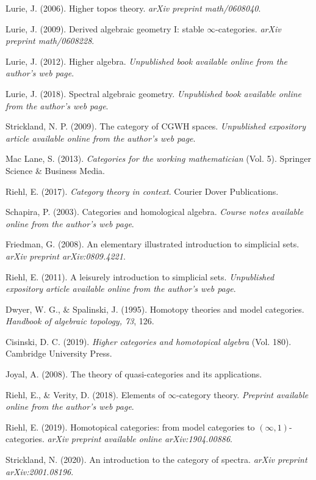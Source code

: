 \documentclass[10pt]{amsart}
\newcommand{\8}{\ensuremath{\infty}}
\newcommand{\0}{\ensuremath{\overset{\rightarrow}{0}}}
\newcommand{\1}{\ensuremath{\mathbf{1}}}
\theoremstyle{definition}
\numberwithin{definition}{subsection}
\numberwithin{definition}{section}
\begin{document}
\begin{thebibliography}{99}
  Lurie, J. (2006). Higher topos theory. \textit{arXiv preprint math/0608040}.

  Lurie, J. (2009). Derived algebraic geometry I: stable $\infty$-categories. \textit{arXiv preprint math/0608228}.

  Lurie, J. (2012). Higher algebra. \textit{Unpublished book available online from the author's web page}.

  Lurie, J. (2018). Spectral algebraic geometry. \textit{Unpublished book available online from the author's web page}.

  Strickland, N. P. (2009). The category of CGWH spaces. \textit{Unpublished expository article available online from the author's web page}.

  Mac Lane, S. (2013). \textit{Categories for the working mathematician} (Vol. 5). Springer Science \& Business Media.

  Riehl, E. (2017). \textit{Category theory in context}. Courier Dover Publications.

  Schapira, P. (2003). Categories and homological algebra. \textit{Course notes available online from the author's web page}.

  Friedman, G. (2008). An elementary illustrated introduction to simplicial sets. \textit{arXiv preprint arXiv:0809.4221}.

  Riehl, E. (2011). A leisurely introduction to simplicial sets. \textit{Unpublished expository article available online from the author's web page}.

  Dwyer, W. G., \& Spalinski, J. (1995). Homotopy theories and model categories. \textit{Handbook of algebraic topology, 73}, 126.

  Cisinski, D. C. (2019). \textit{Higher categories and homotopical algebra} (Vol. 180). Cambridge University Press.

  Joyal, A. (2008). The theory of quasi-categories and its applications.

  Riehl, E., \& Verity, D. (2018). Elements of \8-category theory. \textit{Preprint available online from the author's web page}.

  Riehl, E. (2019). Homotopical categories: from model categories to $(\infty, 1)$-categories. \textit{arXiv preprint available online arXiv:1904.00886}.

  Strickland, N. (2020). An introduction to the category of spectra. \textit{arXiv preprint arXiv:2001.08196}.
\end{thebibliography}
\end{document}
